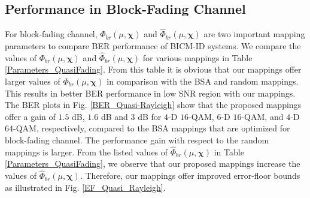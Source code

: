 \documentclass[12pt, draftclsnofoot, onecolumn]{IEEEtran}
\newcommand{\mb}[1]{\boldsymbol{#1}}
\begin{document}
 
\subsection{Performance in   Block-Fading \color{black}  Channel}
For   block-fading \color{black} channel, $\Phi_{br}(\mu,\mb{\chi})$ and $\hat{\Phi}_{br}(\mu,\mb{\chi})$ are two important mapping parameters to compare    BER performance of BICM-ID systems. We compare the values of $\Phi_{br}(\mu,\mb{\chi})$ and $\hat{\Phi}_{br}(\mu,\mb{\chi})$ for various mappings in Table \ref{Parameters_QuasiFading}.  From  this table it is obvious that   our  mappings offer larger values of $\Phi_{br}(\mu,\mb{\chi})$ in comparison with the BSA   and random \color{black} mappings. This results in   better BER performance in low SNR region with our mappings. The  BER plots in
Fig. \ref{BER_Quasi-Rayleigh} show that  the proposed mappings offer a gain of  $1.5$ dB, $1.6$ dB and $3$ dB for $4$-D $16$-QAM, $6$-D $16$-QAM, and $4$-D $64$-QAM, respectively, compared to the BSA mappings that are optimized for   block-fading \color{black} channel.   The  performance gain with respect to  the random mappings is larger.  \color{black} From the  listed values of   $\hat{\Phi}_{br}(\mu,\mb{\chi})$  in Table \ref{Parameters_QuasiFading}, we  observe that  our  proposed mappings increase the values  of $\hat{\Phi}_{br}(\mu,\mb{\chi})$. Therefore,  our mappings offer  improved  error-floor  bounds as illustrated in Fig. \ref{EF_Quasi_Rayleigh}. 
\end{document}
